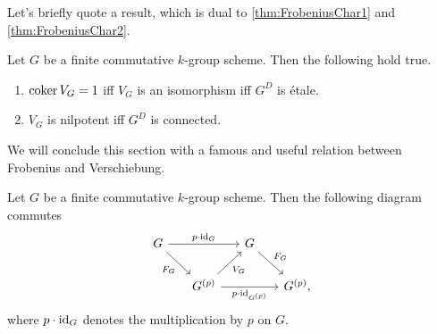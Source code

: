 \noindent
Let's briefly quote a result, which is dual to
\cref{thm:FrobeniusChar1} and \cref{thm:FrobeniusChar2}.
\begin{prop}[]
	Let $G$ be a finite commutative $k$-group scheme. Then the following hold true.
\begin{enumerate}
	\item $\operatorname{coker} V_G = 1$ iff $V_G$ is an isomorphism iff
		$G^D$ is étale.
	\item $V_G$ is nilpotent iff $G^D$ is connected.
\end{enumerate}
\end{prop}


\noindent
We will conclude this section with a famous and useful relation between
Frobenius and Verschiebung.
\begin{thm}\label{thm:FrobeniusVerschiebungRelation}
	Let $G$ be a finite commutative $k$-group scheme. Then the following
	diagram commutes
	\begin{equation*}
	\begin{tikzcd}[column sep=1.5em]
		G \arrow[rr, "p \cdot \id_{ G }", rightarrow] 
		\arrow[rd, "F_G"', rightarrow] & &
		G \arrow[rd, "F_G", rightarrow] & \\
		&
		G^{(p)} \arrow[ru, "V_G"', rightarrow] 
		\arrow[rr, "p \cdot \id_{ G^{(p)} }"', rightarrow] & &
		G^{(p)}
	,\end{tikzcd}
	\end{equation*}
	where $p \cdot \operatorname{id}_{ G }$ denotes the multiplication by $p$
	on $G$.
\end{thm}


